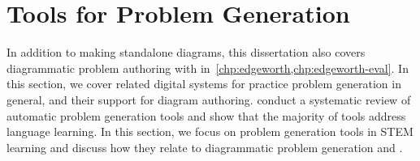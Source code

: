 






\section{Tools for Problem Generation}
\label{sec:problem-generation}

In addition to making standalone diagrams, this dissertation also covers diagrammatic problem authoring with \Edgeworth in~\cref{chp:edgeworth,chp:edgeworth-eval}. In this section, we cover related digital systems for practice problem generation in general, and their support for diagram authoring. \citet{kurdi_systematic_2020} conduct a systematic review of automatic problem generation tools and show that the majority of tools address language learning. In this section, we focus on problem generation tools in STEM learning and discuss how they relate to diagrammatic problem generation and \Edgeworth. 

